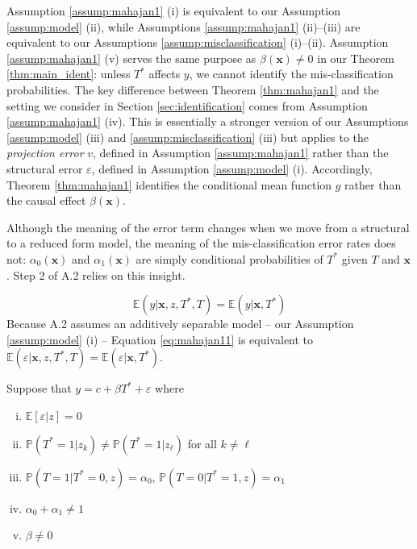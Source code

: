 Assumption \ref{assump:mahajan1} (i) is equivalent to our Assumption \ref{assump:model} (ii), while Assumptions \ref{assump:mahajan1} (ii)--(iii) are equivalent to our Assumptions \ref{assump:misclassification} (i)--(ii).
Assumption \ref{assump:mahajan1} (v) serves the same purpose as $\beta(\mathbf{x}) \neq 0$ in our Theorem \ref{thm:main_ident}: unless $T^*$ affects $y$, we cannot identify the mis-classification probabilities.
The key difference between Theorem \ref{thm:mahajan1} and the setting we consider in Section \ref{sec:identification} comes from Assumption \ref{assump:mahajan1} (iv). 
This is essentially a stronger version of our Assumptions \ref{assump:model} (iii) and \ref{assump:misclassification} (iii) but applies to the \emph{projection error} $v$, defined in Assumption \ref{assump:mahajan1} rather than the structural error $\varepsilon$, defined in Assumption \ref{assump:model} (i).
Accordingly, Theorem \ref{thm:mahajan1} identifies the conditional mean function $g$ rather than the causal effect $\beta(\mathbf{x})$.

Although the meaning of the error term changes when we move from a structural to a reduced form model, the meaning of the mis-classification error rates does not: $\alpha_0(\mathbf{x})$ and $\alpha_1(\mathbf{x})$ are simply conditional probabilities of $T^*$ given $T$ and $\mathbf{x}$.  
Step 2 of \cite{Mahajan} A.2 relies on this insight.

\begin{equation}
  \mathbb{E}(y|\mathbf{x},z,T^*,T) = \mathbb{E}(y|\mathbf{x},T^*)
  \label{eq:mahajan11}
\end{equation}
Because \cite{Mahajan} A.2 assumes an additively separable model -- our Assumption \ref{assump:model} (i) -- Equation \ref{eq:mahajan11} is equivalent to $\mathbb{E}(\varepsilon|\mathbf{x},z,T^*,T)=\mathbb{E}(\varepsilon|\mathbf{x},T^*)$.


\newpage

\begin{assump}[Mahajan A2]\mbox{}
  Suppose that $y = c+ \beta T^* + \varepsilon$ where
  \begin{enumerate}[(i)]
    \item $\mathbb{E}[\varepsilon|z]=0$
    \item $\mathbb{P}(T^*=1|z_k)\neq \mathbb{P}(T^*=1|z_\ell)$ for all $k\neq \ell$
    \item $\mathbb{P}(T = 1| T^* = 0, z) = \alpha_0$, $\mathbb{P}(T = 0| T^* = 1, z) = \alpha_1$
    \item $\alpha_0 + \alpha_1 \neq 1$
    \item $\beta \neq 0$
  \end{enumerate}
\end{assump}

